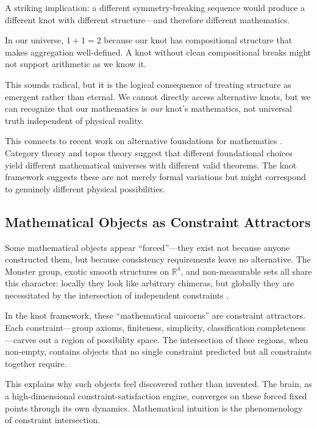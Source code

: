 \documentclass[11pt,a4paper]{article}
\begin{document}
A striking implication: a different symmetry-breaking sequence would produce a different knot with different structure---and therefore different mathematics.

In our universe, $1 + 1 = 2$ because our knot has compositional structure that makes aggregation well-defined. A knot without clean compositional breaks might not support arithmetic as we know it.

This sounds radical, but it is the logical consequence of treating structure as emergent rather than eternal. We cannot directly access alternative knots, but we can recognize that our mathematics is \emph{our} knot's mathematics, not universal truth independent of physical reality.

This connects to recent work on alternative foundations for mathematics \cite{baez2010, leinster2014}. Category theory and topos theory suggest that different foundational choices yield different mathematical universes with different valid theorems. The knot framework suggests these are not merely formal variations but might correspond to genuinely different physical possibilities.

\subsection{Mathematical Objects as Constraint Attractors}

Some mathematical objects appear ``forced''---they exist not because anyone constructed them, but because consistency requirements leave no alternative. The Monster group, exotic smooth structures on $\mathbb{R}^4$, and non-measurable sets all share this character: locally they look like arbitrary chimeras, but globally they are necessitated by the intersection of independent constraints \cite{janik2025unicorns}.

In the knot framework, these ``mathematical unicorns'' are constraint attractors. Each constraint---group axioms, finiteness, simplicity, classification completeness---carves out a region of possibility space. The intersection of these regions, when non-empty, contains objects that no single constraint predicted but all constraints together require.

This explains why such objects feel discovered rather than invented. The brain, as a high-dimensional constraint-satisfaction engine, converges on these forced fixed points through its own dynamics. Mathematical intuition is the phenomenology of constraint intersection.
\end{document}
